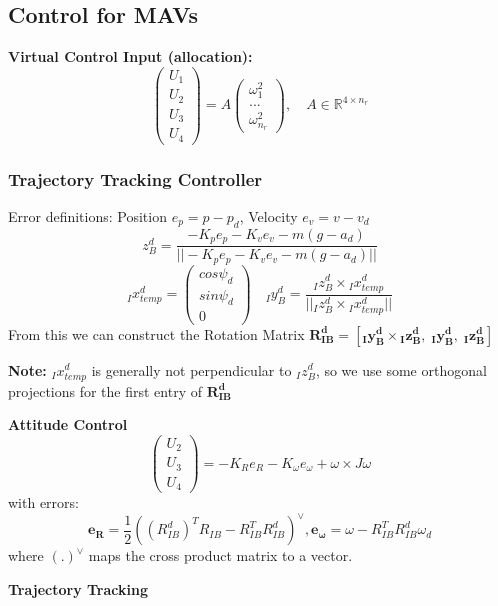 \documentclass[fontsize=6pt,DIV=calc,a4paper,ngerman]{scrartcl}
\begin{document}
\begin{multicols*}{4}
	\subsection{Control for MAVs}

	\textbf{Virtual Control Input (allocation):}\\
	$$\left(\begin{smallmatrix}
				U_1 \\U_2\\U_3\\U_4
			\end{smallmatrix}\right) = A \begin{pmatrix}
			\omega^2_1 \\ ...\\\omega^2_{n_r}
		\end{pmatrix} , \quad A\in \mathbb{R}^{4\times n_r}$$



	\subsubsection{Trajectory Tracking Controller}
	Error definitions: Position $e_p = p-p_d$, Velocity $e_v = v - v_d$
	$$z_B^d = \frac{-K_pe_p-K_ve_v-m(g-a_d)}{||-K_pe_p-K_ve_v-m(g-a_d)||}$$
	$${}_Ix_{temp}^d =
		\begin{pmatrix}
			cos\psi_d \\sin\psi_d\\0
		\end{pmatrix}
		\quad {}_Iy_B^d = \frac{{}_Iz_B^d\times {}_Ix^d_{temp}}{||{}_Iz_B^d\times {}_Ix^d_{temp}||}$$
	From this we can construct the Rotation Matrix  $\mathbf{R_{IB}^d= [{}_Iy_B^d\times {}_Iz_B^d ,\; {}_Iy_B^d ,\;  {}_Iz_B^d]}$

	\textbf{Note:} ${}_Ix_{temp}^d$ is generally not perpendicular to ${}_Iz_B^d$, so we use some orthogonal projections for the first entry of $\mathbf{R_{IB}^d}$

	\smallskip
	\textbf{Attitude Control}
	$$\begin{pmatrix}
			U_2 \\U_3\\U_4
		\end{pmatrix} = -K_Re_R -K_\omega e_\omega + \omega\times J\omega$$
	with errors: $$\mathbf{e_R} = \frac{1}{2}\left((R_{IB}^d)^TR_{IB}-R_{IB}^TR_{IB}^d\right)^\vee,
		\mathbf{e_\omega} = \omega -R_{IB}^TR_{IB}^d\omega_d$$
	where $(.)^\vee$ maps the cross product matrix to a vector.

	\smallskip
	\textbf{Trajectory Tracking}


\end{multicols*}
\end{document}
